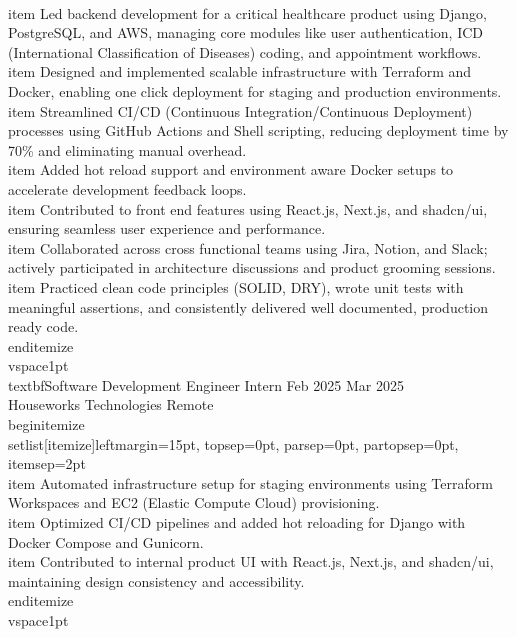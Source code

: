 \documentclass[10pt]{article}
\begin{document}
    \\item Led backend development for a critical healthcare product using Django, PostgreSQL, and AWS, managing core modules like user authentication, ICD (International Classification of Diseases) coding, and appointment workflows. \\item Designed and implemented scalable infrastructure with Terraform and Docker, enabling one\textendash{} click deployment for staging and production environments. \\item Streamlined CI/CD (Continuous Integration/Continuous Deployment) processes using GitHub Actions and Shell scripting, reducing deployment time by 70\% and eliminating manual overhead. \\item Added hot\textendash{} reload support and environment\textendash{} aware Docker setups to accelerate development feedback loops. \\item Contributed to front\textendash{} end features using React.js, Next.js, and shadcn/ui, ensuring seamless user experience and performance. \\item Collaborated across cross\textendash{} functional teams using Jira, Notion, and Slack; actively participated in architecture discussions and product grooming sessions. \\item Practiced clean code principles (SOLID, DRY), wrote unit tests with meaningful assertions, and consistently delivered well\textendash{} documented, production\textendash{} ready code. \\end{itemize}
\\vspace{1pt}
\\textbf{Software Development Engineer Intern} \hfill Feb 2025	\textendash{} Mar 2025 \\
Houseworks Technologies 	\textendash{} Remote \\begin{itemize}\\setlist[itemize]{leftmargin=15pt, topsep=0pt, parsep=0pt, partopsep=0pt, itemsep=2pt}
    \\item Automated infrastructure setup for staging environments using Terraform Workspaces and EC2 (Elastic Compute Cloud) provisioning. \\item Optimized CI/CD pipelines and added hot\textendash{} reloading for Django with Docker Compose and Gunicorn. \\item Contributed to internal product UI with React.js, Next.js, and shadcn/ui, maintaining design consistency and accessibility. \\end{itemize}
\\vspace{1pt}
\end{document}
